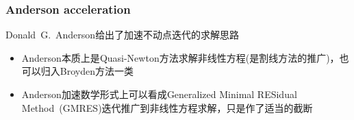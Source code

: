 \frame
{
	\frametitle{\textrm{Anderson acceleration}}
	\textrm{Donald~G.~Anderson}给出了加速不动点迭代的求解思路
	{\fontsize{7.2pt}{1.2pt}}
\begin{itemize}
	\item \textrm{Anderson}本质上是\textrm{Quasi-Newton}方法求解非线性方程(是割线方法的推广)，也可以归入\textrm{Broyden}方法一类

	\item \textrm{Anderson}加速数学形式上可以看成\textrm{Generalized Minimal RESidual Method~(GMRES)}迭代推广到非线性方程求解，只是作了适当的截断
\end{itemize}
}

